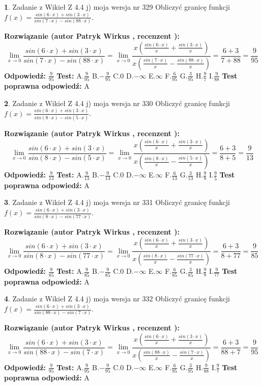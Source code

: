 \documentclass[12pt, a4paper]{article}
\theoremstyle{definition} %
\newtheorem{zad}{}
\newcommand{\zadStart}[1]{\begin{zad}#1\newline}
\newcommand{\zadStop}{\end{zad}}
\newcommand{\rozwStart}[2]{\noindent \textbf{Rozwiązanie (autor #1 , recenzent #2): }\newline}
\newcommand{\rozwStop}{\newline}
\newcommand{\odpStart}{\noindent \textbf{Odpowiedź:}\newline}
\newcommand{\odpStop}{\newline}
\newcommand{\testStart}{\noindent \textbf{Test:}\newline}
\newcommand{\testStop}{\newline}
\newcommand{\kluczStart}{\noindent \textbf{Test poprawna odpowiedź:}\newline}
\newcommand{\kluczStop}{\newline}
\begin{document}
\zadStart{Zadanie z Wikieł Z 4.4 j) moja wersja nr 329}
Obliczyć granicę funkcji $f(x)=\frac{sin(6\cdot x) +sin(3\cdot x)}{sin(7\cdot x) -sin(88\cdot x)}$.
\zadStop
\rozwStart{Patryk Wirkus}{}
$$\lim\limits_{x\to 0}\frac{sin(6\cdot x) +sin(3\cdot x)}{sin(7\cdot x) -sin(88\cdot x)}=\lim\limits_{x\to 0}\frac{x(\frac{sin(6\cdot x)}{x}+\frac{sin(3\cdot x)}{x})}{x(\frac{sin(7\cdot x)}{x}-\frac{sin(88\cdot x)}{x})}=\frac{6+3}{7+88} = \frac{9}{95}$$
\rozwStop
\odpStart
$\frac{9}{95}$
\odpStop
\testStart
A.$\frac{9}{95}$
B.$-\frac{9}{95}$
C.$0$
D.$-\infty$
E.$\infty$
F.$\frac{6}{95}$
G.$\frac{3}{95}$
H.$\frac{9}{7}$
I.$\frac{9}{88}$
\testStop
\kluczStart
A
\kluczStop



\zadStart{Zadanie z Wikieł Z 4.4 j) moja wersja nr 330}
Obliczyć granicę funkcji $f(x)=\frac{sin(6\cdot x) +sin(3\cdot x)}{sin(8\cdot x) -sin(5\cdot x)}$.
\zadStop
\rozwStart{Patryk Wirkus}{}
$$\lim\limits_{x\to 0}\frac{sin(6\cdot x) +sin(3\cdot x)}{sin(8\cdot x) -sin(5\cdot x)}=\lim\limits_{x\to 0}\frac{x(\frac{sin(6\cdot x)}{x}+\frac{sin(3\cdot x)}{x})}{x(\frac{sin(8\cdot x)}{x}-\frac{sin(5\cdot x)}{x})}=\frac{6+3}{8+5} = \frac{9}{13}$$
\rozwStop
\odpStart
$\frac{9}{13}$
\odpStop
\testStart
A.$\frac{9}{13}$
B.$-\frac{9}{13}$
C.$0$
D.$-\infty$
E.$\infty$
F.$\frac{6}{13}$
G.$\frac{3}{13}$
H.$\frac{9}{8}$
I.$\frac{9}{5}$
\testStop
\kluczStart
A
\kluczStop



\zadStart{Zadanie z Wikieł Z 4.4 j) moja wersja nr 331}
Obliczyć granicę funkcji $f(x)=\frac{sin(6\cdot x) +sin(3\cdot x)}{sin(8\cdot x) -sin(77\cdot x)}$.
\zadStop
\rozwStart{Patryk Wirkus}{}
$$\lim\limits_{x\to 0}\frac{sin(6\cdot x) +sin(3\cdot x)}{sin(8\cdot x) -sin(77\cdot x)}=\lim\limits_{x\to 0}\frac{x(\frac{sin(6\cdot x)}{x}+\frac{sin(3\cdot x)}{x})}{x(\frac{sin(8\cdot x)}{x}-\frac{sin(77\cdot x)}{x})}=\frac{6+3}{8+77} = \frac{9}{85}$$
\rozwStop
\odpStart
$\frac{9}{85}$
\odpStop
\testStart
A.$\frac{9}{85}$
B.$-\frac{9}{85}$
C.$0$
D.$-\infty$
E.$\infty$
F.$\frac{6}{85}$
G.$\frac{3}{85}$
H.$\frac{9}{8}$
I.$\frac{9}{77}$
\testStop
\kluczStart
A
\kluczStop



\zadStart{Zadanie z Wikieł Z 4.4 j) moja wersja nr 332}
Obliczyć granicę funkcji $f(x)=\frac{sin(6\cdot x) +sin(3\cdot x)}{sin(88\cdot x) -sin(7\cdot x)}$.
\zadStop
\rozwStart{Patryk Wirkus}{}
$$\lim\limits_{x\to 0}\frac{sin(6\cdot x) +sin(3\cdot x)}{sin(88\cdot x) -sin(7\cdot x)}=\lim\limits_{x\to 0}\frac{x(\frac{sin(6\cdot x)}{x}+\frac{sin(3\cdot x)}{x})}{x(\frac{sin(88\cdot x)}{x}-\frac{sin(7\cdot x)}{x})}=\frac{6+3}{88+7} = \frac{9}{95}$$
\rozwStop
\odpStart
$\frac{9}{95}$
\odpStop
\testStart
A.$\frac{9}{95}$
B.$-\frac{9}{95}$
C.$0$
D.$-\infty$
E.$\infty$
F.$\frac{6}{95}$
G.$\frac{3}{95}$
H.$\frac{9}{88}$
I.$\frac{9}{7}$
\testStop
\kluczStart
A
\kluczStop
\end{document}
